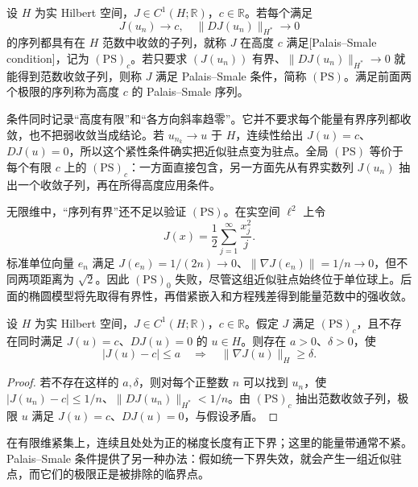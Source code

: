 \begin{definition}\label{b2:def:14-palais-smale}
设 \(H\) 为实 Hilbert 空间，\(J\in C^1(H;\mathbb R)\)，\(c\in\mathbb R\)。若每个满足
\[
 J(u_n)\longrightarrow c,
 \quad \|DJ(u_n)\|_{H^*}\longrightarrow0
\]
的序列都具有在 \(H\) 范数中收敛的子列，就称 \(J\) 在高度 \(c\) 满足[Palais--Smale condition]，记为 \((\mathrm{PS})_c\)。若只要求 \((J(u_n))\) 有界、\(\|DJ(u_n)\|_{H^*}\to0\) 就能得到范数收敛子列，则称 \(J\) 满足 Palais–Smale 条件，简称 \((\mathrm{PS})\)。满足前面两个极限的序列称为高度 \(c\) 的 Palais–Smale 序列。
\end{definition}

条件同时记录“高度有限”和“各方向斜率趋零”。它并不要求每个能量有界序列都收敛，也不把弱收敛当成结论。若 \(u_{n_k}\to u\) 于 \(H\)，连续性给出 \(J(u)=c\)、\(DJ(u)=0\)，所以这个紧性条件确实把近似驻点变为驻点。全局 \((\mathrm{PS})\) 等价于每个有限 \(c\) 上的 \((\mathrm{PS})_c\)：一方面直接包含，另一方面先从有界实数列 \(J(u_n)\) 抽出一个收敛子列，再在所得高度应用条件。

\ProseParagraphBreak

无限维中，“序列有界”还不足以验证 \((\mathrm{PS})\)。在实空间 \(\ell^2\) 上令
\[
 J(x)=\frac12\sum_{j=1}^{\infty}\frac{x_j^2}{j}.
\]
标准单位向量 \(e_n\) 满足 \(J(e_n)=1/(2n)\to0\)、\(\|\nabla J(e_n)\|=1/n\to0\)，但不同两项距离为 \(\sqrt2\)。因此 \((\mathrm{PS})_0\) 失败，尽管这组近似驻点始终位于单位球上。后面的椭圆模型将先取得有界性，再借紧嵌入和方程残差得到能量范数中的强收敛。

\begin{lemma}[非临界高度附近的梯度下界]\label{b2:lem:14-ps-gradient-gap}
设 \(H\) 为实 Hilbert 空间，\(J\in C^1(H;\mathbb R)\)，\(c\in\mathbb R\)。假定 \(J\) 满足 \((\mathrm{PS})_c\)，且不存在同时满足 \(J(u)=c\)、\(DJ(u)=0\) 的 \(u\in H\)。则存在 \(a>0\)、\(\delta>0\)，使
\[
 |J(u)-c|\le a\quad\Longrightarrow\quad
 \|\nabla J(u)\|_H\ge\delta.
\]
\end{lemma}
\begin{proof}
若不存在这样的 \(a,\delta\)，则对每个正整数 \(n\) 可以找到 \(u_n\)，使 \(|J(u_n)-c|\le1/n\)、\(\|DJ(u_n)\|_{H^*}<1/n\)。由 \((\mathrm{PS})_c\) 抽出范数收敛子列，极限 \(u\) 满足 \(J(u)=c\)、\(DJ(u)=0\)，与假设矛盾。
\end{proof}

在有限维紧集上，连续且处处为正的梯度长度有正下界；这里的能量带通常不紧。Palais–Smale 条件提供了另一种办法：假如统一下界失效，就会产生一组近似驻点，而它们的极限正是被排除的临界点。

